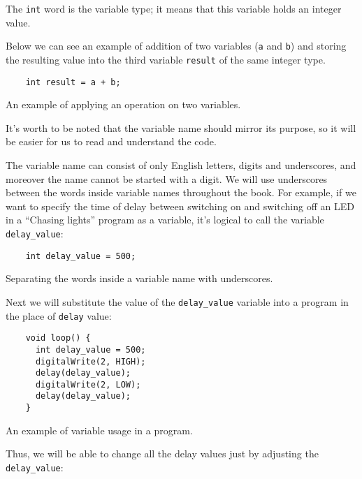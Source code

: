 \documentclass[../sparc.tex]{subfiles}
\begin{document}
The \texttt{int} word is the variable type; it means that this variable holds an
integer value.

Below we can see an example of addition of two variables (\texttt{a} and
\texttt{b}) and storing the resulting value into the third variable
\texttt{result} of the same integer type.

\begin{listing}[ht]
  \begin{verbatim}
    int result = a + b;
  \end{verbatim}
  \label{listing:dialogues-with-computer-variable-operations-example}
  \caption{An example of applying an operation on two variables.}
\end{listing}

It's worth to be noted that the variable name should mirror its purpose, so it
will be easier for us to read and understand the code.

The variable name can consist of only English letters, digits and underscores,
and moreover the name cannot be started with a digit.  We will use underscores
between the words inside variable names throughout the book.  For example, if we
want to specify the time of delay between switching on and switching off an LED
in a ``Chasing lights'' program as a variable, it's logical to call the variable
\texttt{delay\_value}:

\begin{listing}[ht]
  \begin{verbatim}
    int delay_value = 500;
  \end{verbatim}
  \label{listing:dialogues-with-computer-variable-names}
  \caption{Separating the words inside a variable name with underscores.}
\end{listing}

Next we will substitute the value of the \texttt{delay\_value} variable into a
program in the place of \texttt{delay} value:

\begin{listing}[ht]
  \begin{verbatim}
    void loop() {
      int delay_value = 500;
      digitalWrite(2, HIGH);
      delay(delay_value);
      digitalWrite(2, LOW);
      delay(delay_value);
    }
  \end{verbatim}
  \label{listing:dialogues-with-computer-variable-usage}
  \caption{An example of variable usage in a program.}
\end{listing}

Thus, we will be able to change all the delay values just by adjusting the
\texttt{delay\_value}:
\end{document}
